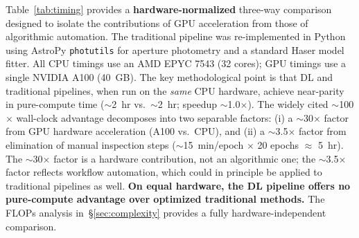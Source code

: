 \documentclass[usenatbib]{mnras}
\begin{document}
Table~\ref{tab:timing} provides a \textbf{hardware-normalized} three-way comparison designed to isolate the contributions of GPU acceleration from those of algorithmic automation. The traditional pipeline was re-implemented in Python using AstroPy \texttt{photutils} for aperture photometry and a standard Haser model fitter. All CPU timings use an AMD EPYC 7543 (32 cores); GPU timings use a single NVIDIA A100 (40~GB). The key methodological point is that DL and traditional pipelines, when run on the \textit{same} CPU hardware, achieve near-parity in pure-compute time ($\sim$2~hr vs.\ $\sim$2~hr; speedup $\sim$1.0$\times$). The widely cited $\sim$100$\times$ wall-clock advantage decomposes into two separable factors: (i) a $\sim$30$\times$ factor from GPU hardware acceleration (A100 vs.\ CPU), and (ii) a $\sim$3.5$\times$ factor from elimination of manual inspection steps ($\sim$15~min/epoch $\times$ 20 epochs $\approx$ 5~hr). The $\sim$30$\times$ factor is a hardware contribution, not an algorithmic one; the $\sim$3.5$\times$ factor reflects workflow automation, which could in principle be applied to traditional pipelines as well. \textbf{On equal hardware, the DL pipeline offers no pure-compute advantage over optimized traditional methods.} The FLOPs analysis in~\S\ref{sec:complexity} provides a fully hardware-independent comparison.
\end{document}
